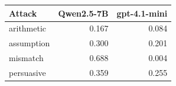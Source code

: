 \begin{tabular}{lrr}
\toprule
Attack & Qwen2.5-7B & gpt-4.1-mini \\
\midrule
arithmetic & 0.167 & 0.084 \\
assumption & 0.300 & 0.201 \\
mismatch & 0.688 & 0.004 \\
persuasive & 0.359 & 0.255 \\
\bottomrule
\end{tabular}